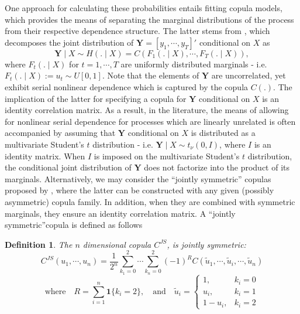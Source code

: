 \documentclass[harvard,11pt]{article}
\newtheorem{definition}{Definition}
\begin{document}
One approach for calculating these probabilities entails fitting copula models, which provides the means of separating the marginal distributions of the process from their respective dependence structure. The latter stems from \citet{sklar1959fonctions}, which decomposes the joint distribution of $\bm{Y}=[y_1,\cdots,y_T]'$ conditional on $X$ as
\[
\bm{Y}\mid X \sim H(.\mid X)=C\left(F_1(.\mid X),\cdots,F_T(.\mid X)\right),
\] 
where $F_t(.\mid X)$ for $t=1,\cdots,T$ are uniformly distributed marginals - i.e. $F_t(.\mid X):= u_t\sim U[0,1]$. Note that the elements of $\bm{Y}$ are uncorrelated, yet exhibit serial nonlinear dependence which is captured by the copula $C(.)$. The implication of the latter for specifying a copula for $\bm{Y}$ conditional on $X$ is an identity correlation matrix. As a result, in the literature, the means of allowing for nonlinear serial dependence for processes which are linearly unrelated is often accompanied by assuming that $\bm{Y}$ conditional on $X$ is distributed as a multivariate Student's $t$ distribution - i.e. $\bm{Y}\mid X\sim t_{\nu}(0,I)$, where $I$ is an identity matrix. When $I$ is imposed on the multivariate Student's $t$ distribution, the conditional joint distribution of $\bm{Y}$ does not factorize into the product of its marginals. Alternatively, we may consider the \textquotedblleft jointly symmetric\textquotedblright{ }copulas proposed by \citet{oh2016high}, where the latter can be constructed with any given (possibly asymmetric) copula family. In addition, when they are combined with symmetric marginals, they ensure an identity correlation matrix. A \textquotedblleft jointly symmetric\textquotedblright copula is defined as follows
\begin{definition}
The $n$ dimensional copula $C^{JS}$, is jointly symmetric:
\[
C^{JS}\left(u_1,\cdots,u_n\right)=\frac{1}{2^n}\sum\limits_{k_1=0}^{2}\cdots\sum\limits_{k_n=0}^{2}\left(-1\right)^R C(\tilde{u}_1,\cdots,\tilde{u}_i,\cdots,\tilde{u}_n)
\] 
\[
\text{where}\quad R=\sum\limits_{i=1}^n\bm{1}\{k_i=2\},\quad\text{and}\quad\tilde{u}_i=
\begin{cases}
1,& k_i=0\\
u_i,&k_i=1\\
1-u_i,& k_i=2
\end{cases}
\]
 \end{definition}
\end{document}
